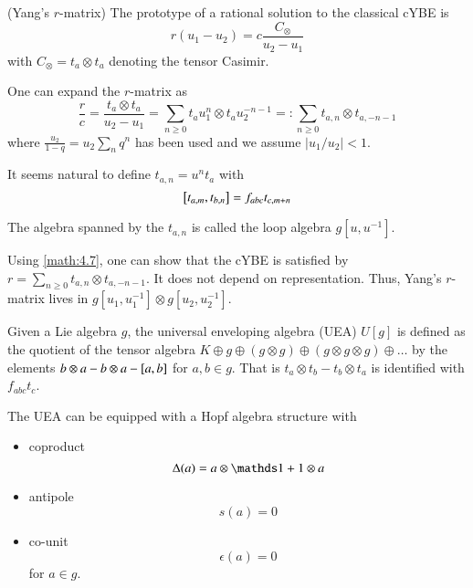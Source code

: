 \begin{example} (Yang's $r$-matrix)	
	The prototype of a rational solution to the classical cYBE is
	\begin{equation}
		r(u_1 - u_2) = c \frac{C_{\otimes}}{u_2 - u_1}
	\end{equation}
	with $C_\otimes = t_a \otimes t_a$ denoting the tensor Casimir.

	One can expand the $r$-matrix as 
	\begin{equation}
		\frac{r}{c} = \frac{t_a \otimes t_a}{u_2 - u_1} = \sum_{n \geq 0} t_a u_1^n \otimes t_a u_2^{-n-1} =: \sum_{n \geq 0} t_{a, n} \otimes t_{a, -n-1}
	\end{equation}
	where $\frac{u_2}{1-q} = u_2 \sum_n q^{n}$ has been used and we assume $|u_1 / u_2| < 1$.

	It seems natural to define $t_{a, n} = u^n t_a$ with 
	\begin{equation}
		\comm{t_{a, m}}{t_{b, n}} = f_{abc} t_{c, m+n}
		\label{math:4.7}
	\end{equation}
\end{example}

\begin{definition}
	\label{def:4.1}
	The algebra spanned by the $t_{a, n}$ is called the loop algebra $g[u, u^{-1}]$.	
\end{definition}

Using \eqref{math:4.7}, one can show that the cYBE is satisfied by $r = \sum_{n \geq 0} t_{a, n} \otimes t_{a, -n-1}$. It does not depend on representation. Thus, Yang's $r$-matrix lives in $g[u_1, u_1^{-1}] \otimes g[u_2, u_2^{-1}]$.

\begin{definition}
	\label{def:4.2}
	Given a Lie algebra $g$, the universal enveloping algebra (UEA) $U[g]$ is defined as the quotient of the tensor algebra $K \oplus g \oplus (g \otimes g) \oplus (g \otimes g \otimes g) \oplus \dots $ by the elements $b \otimes a - b \otimes a - \comm{a}{b}$ for $a, b \in g$. That is $t_a \otimes t_b - t_b \otimes t_a$ is identified with $f_{abc}t_c$.

	The UEA can be equipped with a Hopf algebra structure with 
	\begin{itemize}
	\item  coproduct
	\begin{equation}
		\Delta (a) = a \otimes \id + 1 \otimes a
	\end{equation}
	\item antipole
	\begin{equation}
		s(a) = 0
	\end{equation}
	\item co-unit
	\begin{equation}
		\epsilon(a) = 0
	\end{equation}
	for $a \in g$.
	\end{itemize}
\end{definition}

